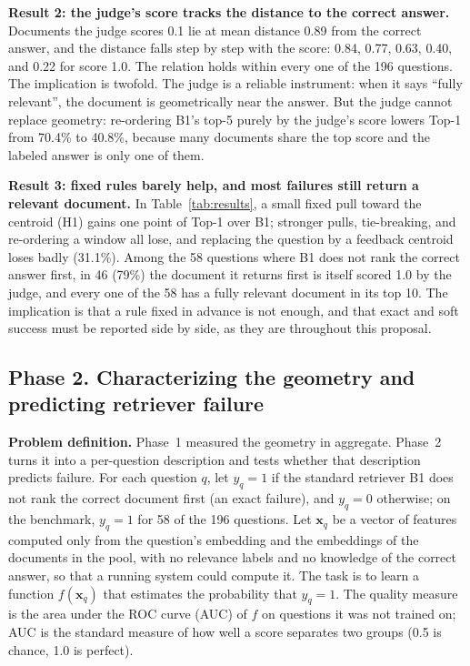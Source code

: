 \documentclass[12pt,a4paper]{article}
\begin{document}
\textbf{Result 2: the judge's score tracks the distance to the correct answer.} Documents the judge scores 0.1 lie at mean distance 0.89 from the correct answer, and the distance falls step by step with the score: 0.84, 0.77, 0.63, 0.40, and 0.22 for score 1.0. The relation holds within every one of the 196 questions. The implication is twofold. The judge is a reliable instrument: when it says ``fully relevant'', the document is geometrically near the answer. But the judge cannot replace geometry: re-ordering B1's top-5 purely by the judge's score lowers Top-1 from 70.4\% to 40.8\%, because many documents share the top score and the labeled answer is only one of them.

\textbf{Result 3: fixed rules barely help, and most failures still return a relevant document.} In Table~\ref{tab:results}, a small fixed pull toward the centroid (H1) gains one point of Top-1 over B1; stronger pulls, tie-breaking, and re-ordering a window all lose, and replacing the question by a feedback centroid loses badly (31.1\%). Among the 58 questions where B1 does not rank the correct answer first, in 46 (79\%) the document it returns first is itself scored 1.0 by the judge, and every one of the 58 has a fully relevant document in its top 10. The implication is that a rule fixed in advance is not enough, and that exact and soft success must be reported side by side, as they are throughout this proposal.

\subsection{Phase 2. Characterizing the geometry and predicting retriever failure}

\textbf{Problem definition.} Phase~1 measured the geometry in aggregate. Phase~2 turns it into a per-question description and tests whether that description predicts failure. For each question $q$, let $y_q = 1$ if the standard retriever B1 does not rank the correct document first (an exact failure), and $y_q = 0$ otherwise; on the benchmark, $y_q=1$ for 58 of the 196 questions. Let $\mathbf{x}_q$ be a vector of features computed only from the question's embedding and the embeddings of the documents in the pool, with no relevance labels and no knowledge of the correct answer, so that a running system could compute it. The task is to learn a function $f(\mathbf{x}_q)$ that estimates the probability that $y_q=1$. The quality measure is the area under the ROC curve (AUC) of $f$ on questions it was not trained on; AUC is the standard measure of how well a score separates two groups (0.5 is chance, 1.0 is perfect).
\end{document}
